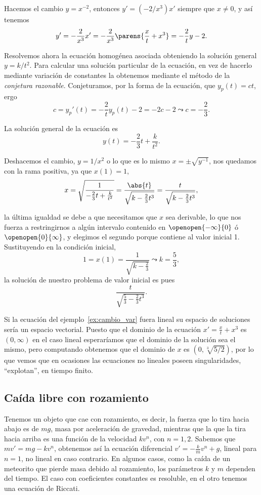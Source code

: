 \documentclass[../ecuaciones_diferenciales.tex]{subfiles}
\begin{document}
\begin{solution}
	Hacemos el cambio \(y = x^{-2}\), entonces \(y' = (-2/x^3) x'\) siempre que
	\(x \neq 0\), y así tenemos
	\[y' = -\frac{2}{x^3} x' = -\frac{2}{x^3}\parens{\frac{x}{t} + x^3} =
		-\frac{2}{t}y - 2.\]

	Resolvemos ahora la ecuación homogénea asociada obteniendo la solución
	general \(y = k/t^2\). Para calcular una solución particular de la
	ecuación, en vez de hacerlo mediante variación de constantes la obtenemos
	mediante el método de la \emph{conjetura razonable}. Conjeturamos, por la
	forma de la ecuación, que \(y_p(t) = ct\), ergo
	\[c = y_p'(t) = -\frac{2}{t} y_p(t) - 2 = -2c -2
		\leadsto c = -\frac{2}{3}.\]

	La solución general de la ecuación es
	\[y(t) = -\frac{2}{3}t + \frac{k}{t^2}.\]

	Deshacemos el cambio, \(y = 1/x^2\) o lo que es lo mismo
	\(x = \pm \sqrt{y^{-1}}\), nos quedamos con la rama positiva, ya que
	\(x(1) = 1\),
	\[x = \sqrt{\frac{1}{-\frac{2}{3}t + \frac{k}{t^2}}} =
		\frac{\abs{t}}{\sqrt{k - \frac{2}{3}t^3}} = \frac{t}{\sqrt{k -
				\frac{2}{3}t^3}},\]

	la última igualdad se debe a que necesitamos que \(x\) sea derivable, lo que
	nos fuerza a restringirnos a algún intervalo contenido en
	\(\openopen{-\infty}{0}\) ó \(\openopen{0}{\infty}\), y elegimos el segundo
	porque contiene al valor inicial 1.  Sustituyendo en la condición inicial,
	\[1 = x(1) = \frac{1}{\sqrt{k - \frac{2}{3}}} \leadsto k = \frac{5}{3},\]
	la solución de nuestro problema de valor inicial es pues
	\[\frac{t}{\sqrt{\frac{5}{3} - \frac{2}{3}t^3}}.\]
\end{solution}

\begin{remark}
	Si la ecuación del ejemplo~\ref{ex:cambio_var} fuera lineal su espacio de
	soluciones sería un espacio vectorial. Puesto que el dominio de la ecuación
	\(x' = \frac{x}{t} + x^3\) es \((0, \infty)\) en el caso lineal esperaríamos
	que el dominio de la solución sea el mismo, pero computando obtenemos que el
	dominio de \(x\) es \((0, \sqrt[3]{5/2})\), por lo que vemos que en ocasiones
	las ecuaciones no lineales poseen singularidades, ``explotan'', en tiempo
	finito.
\end{remark}

\subsection{Caída libre con rozamiento}
Tenemos un objeto que cae con rozamiento, es decir, la fuerza que lo tira
hacia abajo es de \(mg\), masa por aceleración de gravedad, mientras que la
que la tira hacia arriba es una función de la velocidad \(kv^n\), con
\(n = 1,2\). Sabemos que \(mv' = mg - kv^n\), obtenemos así la ecuación
diferencial \(v' = -\frac{k}{m} v^n + g\), lineal para \(n = 1\), no lineal
en caso contrario. En algunos casos, como la caída de un meteorito que
pierde masa debido al rozamiento, los parámetros \(k\) y \(m\) dependen del
tiempo. El caso con coeficientes constantes es resoluble, en el otro tenemos una
ecuación de  Riccati.
\end{document}
